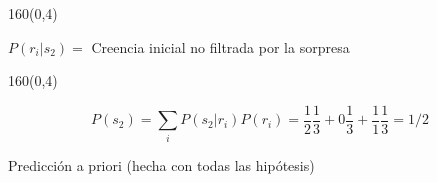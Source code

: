 \documentclass[shownotes,aspectratio=169]{beamer}
\newif\ifes
\newcommand{\es}[1]{\ifes#1\fi}
\begin{document}
\begin{frame}[plain]
 
 
\end{frame}

\begin{frame}[plain]
\begin{textblock}{160}(0,4)
 \centering \LARGE 
 \es{Posterior}
 \end{textblock}
 \vspace{1cm}
 
 \begin{center}
 $P(r_i|s_2) = $ \Large Creencia inicial no filtrada por la sorpresa
 \end{center}

\end{frame}

\begin{frame}[plain]
\begin{textblock}{160}(0,4)
 \centering \LARGE 
 \es{Evidencia}
 \end{textblock}
 \vspace{1cm}
 
 \begin{equation*}
  P(s_2) = \sum_i P(s_2|r_i) P(r_i) = \frac{1}{2} \frac{1}{3} + 0 \frac{1}{3} + \frac{1}{1} \frac{1}{3} = 1/2 
 \end{equation*}

 \begin{center}
 \Large Predicción a priori (hecha con todas las hipótesis)
 \end{center}

\end{frame}


% 
% 
% 
% 
\end{document}
